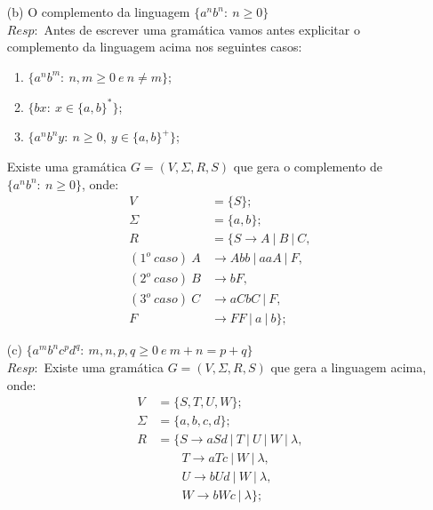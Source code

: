 \documentclass{homework}
\begin{document}
\pagestyle{fancy}

	\begin{itemize}
		\item[(b)] O complemento da linguagem $\{a^n b^n:\ n \geq 0\}$\\
		$Resp:$ Antes de escrever uma gramática vamos antes explicitar o complemento da linguagem acima nos seguintes casos:
		\begin{enumerate}
			\item $\{a^n b^m:\ n,m \geq 0\ e\ n \neq m\}$;
			\item $\{b x:\ x \in \{a,b\}^*\}$;
			\item $\{a^n b^n y:\ n \geq 0,\ y \in \{a,b\}^+\}$;
		\end{enumerate}		 Existe uma gramática $G = (V, \Sigma, R, S)$ que gera o complemento de $\{a^n b^n:\ n \geq 0\}$, onde: %
		\begin{align*}
			V &= \{S\};\\
			\Sigma &= \{a,b\};\\
			R &= \{S \rightarrow A\ |\ B\ |\ C,\\
			(1^o\ caso)\ A & \rightarrow Abb\ |\ aaA\ |\ F,\\
			(2^o\ caso)\ B & \rightarrow bF,\\
			(3^o\ caso)\ C & \rightarrow aCbC\ |\ F,\\
			F & \rightarrow FF\ |\ a\ |\ b\};
		\end{align*}
		\item[(c)] $\{a^m b^n c^p d^q:\ m,n,p,q \geq 0\ e\ m + n = p + q\}$\\
		$Resp:$ Existe uma gramática $G = (V, \Sigma, R, S)$ que gera a linguagem acima, onde: %
		\begin{align*}
			V &= \{S, T, U, W\};\\
			\Sigma &= \{a,b,c,d\};\\
			R &= \{S \rightarrow aSd\ |\ T\ |\ U\ |\ W\ |\ \lambda,\\
				&\qquad	T \rightarrow aTc\ |\ W\ |\ \lambda, \\
				&\qquad	U \rightarrow bUd\ |\ W\ |\ \lambda, \\
				&\qquad	W \rightarrow bWc\ |\ \lambda\};
		\end{align*}
	\end{itemize}
\pagebreak
\end{document}
